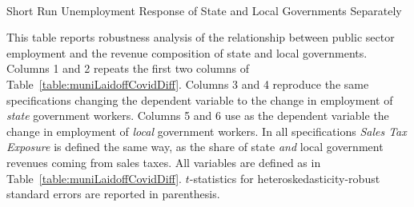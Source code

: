 \begin{landscape}
\begin{table}[!ht]
\begin{center}
\begin{threeparttable}

\caption{\\ Short Run Unemployment Response of State and Local Governments Separately}
\label{table:muniLaidoffStateandLocal}

\centering 

\begin{small}

	

\end{small}

\begin{footnotesize}
\begin{tablenotes}
\item This table reports robustness analysis of the relationship between public sector employment and the revenue composition of state and local governments. Columns 1 and 2 repeats the first two columns of Table~\ref{table:muniLaidoffCovidDiff}. Columns 3 and 4 reproduce the same specifications changing the dependent variable to the change in employment of \emph{state} government workers. Columns 5 and 6 use as the dependent variable the change in employment of \emph{local} government workers. In all specifications \emph{Sales Tax Exposure} is defined the same way, as the share of state \emph{and} local government revenues coming from sales taxes. All variables are defined as in Table~\ref{table:muniLaidoffCovidDiff}. $t$-statistics for heteroskedasticity-robust standard errors are reported in parenthesis. 

\end{tablenotes}
\end{footnotesize}
\end{threeparttable}
\end{center}
\end{table}
\thispagestyle{empty}
\end{landscape}





